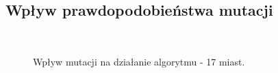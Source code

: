 \documentclass[12pt, a4paper]{article}
\begin{document}
\subsection{Wpływ prawdopodobieństwa mutacji}
\begin{figure}[H]
\centering
\mbox{\quad
{} 
}
\caption{Wpływ mutacji na działanie algorytmu - 17 miast.}
\end{figure}
\end{document}
